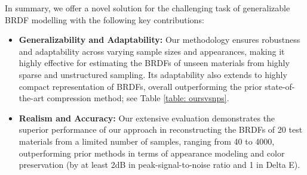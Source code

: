In summary, we offer a novel solution for the challenging task of generalizable BRDF modelling with the following key contributions:
\begin{itemize}
    \item{\textbf{Generalizability and Adaptability:} Our methodology ensures robustness and adaptability across varying sample sizes and appearances, making it highly effective for estimating the BRDFs of unseen materials from highly sparse and unstructured sampling. Its adaptability also extends to highly compact representation of BRDFs, overall outperforming the prior state-of-the-art compression method; see Table \ref{table: oursvsnps}.}
    

    \item{\textbf{Realism and Accuracy:}
    Our extensive evaluation demonstrates the superior performance of our approach in reconstructing the BRDFs of 20 test materials from a limited number of samples, ranging from 40 to 4000, outperforming prior methods in terms of appearance modeling and color preservation (by at least 2dB in peak-signal-to-noise ratio and 1 in Delta E).
    }
\end{itemize}
